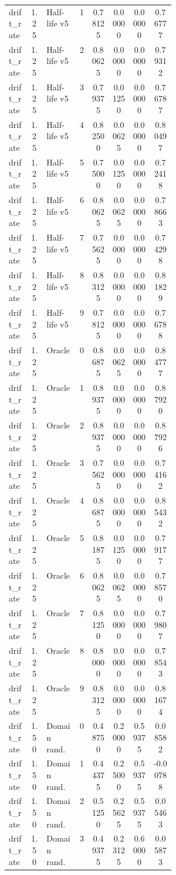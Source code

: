 \documentclass{article}
\begin{document}
\begin{center}
\begin{longtable}{p{0.13\linewidth}cp{0.20\linewidth}ccccc}
drift\_rate & 1.25 & Half-life v5 & 1 & 0.78125 & 0.00000 & 0.00000 & 0.76777\\
drift\_rate & 1.25 & Half-life v5 & 2 & 0.80625 & 0.00000 & 0.00000 & 0.79312\\
drift\_rate & 1.25 & Half-life v5 & 3 & 0.79375 & 0.01250 & 0.00000 & 0.76787\\
drift\_rate & 1.25 & Half-life v5 & 4 & 0.82500 & 0.00625 & 0.00000 & 0.80497\\
drift\_rate & 1.25 & Half-life v5 & 5 & 0.75000 & 0.01250 & 0.00000 & 0.72418\\
drift\_rate & 1.25 & Half-life v5 & 6 & 0.80625 & 0.00625 & 0.00000 & 0.78663\\
drift\_rate & 1.25 & Half-life v5 & 7 & 0.75625 & 0.00000 & 0.00000 & 0.74298\\
drift\_rate & 1.25 & Half-life v5 & 8 & 0.83125 & 0.00000 & 0.00000 & 0.81829\\
drift\_rate & 1.25 & Half-life v5 & 9 & 0.78125 & 0.00000 & 0.00000 & 0.76788\\
drift\_rate & 1.25 & Oracle & 0 & 0.86875 & 0.00625 & 0.00000 & 0.84777\\
drift\_rate & 1.25 & Oracle & 1 & 0.89375 & 0.00000 & 0.00000 & 0.87920\\
drift\_rate & 1.25 & Oracle & 2 & 0.89375 & 0.00000 & 0.00000 & 0.87926\\
drift\_rate & 1.25 & Oracle & 3 & 0.75625 & 0.00000 & 0.00000 & 0.74162\\
drift\_rate & 1.25 & Oracle & 4 & 0.86875 & 0.00000 & 0.00000 & 0.85432\\
drift\_rate & 1.25 & Oracle & 5 & 0.81875 & 0.01250 & 0.00000 & 0.79177\\
drift\_rate & 1.25 & Oracle & 6 & 0.80625 & 0.00625 & 0.00000 & 0.78570\\
drift\_rate & 1.25 & Oracle & 7 & 0.81250 & 0.00000 & 0.00000 & 0.79807\\
drift\_rate & 1.25 & Oracle & 8 & 0.80000 & 0.00000 & 0.00000 & 0.78543\\
drift\_rate & 1.25 & Oracle & 9 & 0.83125 & 0.00000 & 0.00000 & 0.81674\\
drift\_rate & 1.50 & Domain rand. & 0 & 0.48750 & 0.20000 & 0.59375 & 0.08582\\
drift\_rate & 1.50 & Domain rand. & 1 & 0.44375 & 0.25000 & 0.59375 & -0.00788\\
drift\_rate & 1.50 & Domain rand. & 2 & 0.51250 & 0.25625 & 0.59375 & 0.05463\\
drift\_rate & 1.50 & Domain rand. & 3 & 0.49375 & 0.23125 & 0.60000 & 0.05873\\

\end{longtable}
\end{center}
\end{document}
